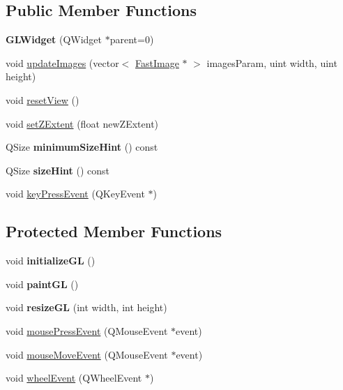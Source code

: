 \subsection*{Public Member Functions}
\begin{DoxyCompactItemize}
\item 
\hypertarget{class_g_l_widget_ab79c391c86de1ffb76f6950b49d82c0c}{
{\bfseries GLWidget} (QWidget $\ast$parent=0)}
\label{class_g_l_widget_ab79c391c86de1ffb76f6950b49d82c0c}

\item 
void \hyperlink{class_g_l_widget_a9601076e0757c5fe221e28d3e9983b75}{updateImages} (vector$<$ \hyperlink{class_fast_image}{FastImage} $\ast$ $>$ imagesParam, uint width, uint height)
\item 
void \hyperlink{class_g_l_widget_ae0cb1922c7f58b363fe4577a8a2c5d1e}{resetView} ()
\item 
void \hyperlink{class_g_l_widget_a68406450ab1961b48ebc786cb61b4d48}{setZExtent} (float newZExtent)
\item 
\hypertarget{class_g_l_widget_ade3142625c1bfda0576e419b176cf8b1}{
QSize {\bfseries minimumSizeHint} () const }
\label{class_g_l_widget_ade3142625c1bfda0576e419b176cf8b1}

\item 
\hypertarget{class_g_l_widget_a57698bc426052845b43a135a13540154}{
QSize {\bfseries sizeHint} () const }
\label{class_g_l_widget_a57698bc426052845b43a135a13540154}

\item 
void \hyperlink{class_g_l_widget_a35e6da60485a6b10fe24ac386b708071}{keyPressEvent} (QKeyEvent $\ast$)
\end{DoxyCompactItemize}
\subsection*{Protected Member Functions}
\begin{DoxyCompactItemize}
\item 
\hypertarget{class_g_l_widget_a7fab13e8cc9fc0730ca54c08b2c923a7}{
void {\bfseries initializeGL} ()}
\label{class_g_l_widget_a7fab13e8cc9fc0730ca54c08b2c923a7}

\item 
\hypertarget{class_g_l_widget_a640b5570cb2b37724fd5b58a77339c5e}{
void {\bfseries paintGL} ()}
\label{class_g_l_widget_a640b5570cb2b37724fd5b58a77339c5e}

\item 
\hypertarget{class_g_l_widget_ac0d2a8ecf60907a81c0d73475d851025}{
void {\bfseries resizeGL} (int width, int height)}
\label{class_g_l_widget_ac0d2a8ecf60907a81c0d73475d851025}

\item 
void \hyperlink{class_g_l_widget_ab144cc8064c1bbf6d0ef0646ca0bd06c}{mousePressEvent} (QMouseEvent $\ast$event)
\item 
void \hyperlink{class_g_l_widget_a9043bac13d6f0a5307ea5c7f9b3caa50}{mouseMoveEvent} (QMouseEvent $\ast$event)
\item 
void \hyperlink{class_g_l_widget_ab11fb26fd97e5bf66989f072760b1617}{wheelEvent} (QWheelEvent $\ast$)
\end{DoxyCompactItemize}


